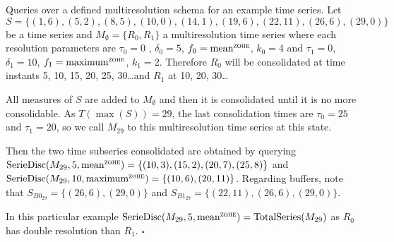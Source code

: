 \begin{example}\label{ex:model:smultiresolution} Queries over a defined
  multiresolution schema for an example time series.  Let $S = \{
  (1,6),(5,2),\allowbreak (8,5),\allowbreak (10,0),\allowbreak
  (14,1),\allowbreak (19,6),\allowbreak (22,11),\allowbreak
  (26,6),(29,0) \}$ be a time series and $M_\emptyset=\{R_0,R_1\}$ a
  multiresolution time series where each resolution parameters are
  $\tau_0=0$ , $\delta_0=5$, $f_0 =\meanz$, $k_0=4$ and $\tau_1=0$,
  $\delta_1=10$, $f_1 =\maxz$, $k_1=2$. Therefore $R_0$ will be
  consolidated at time instants 5, 10, 15, 20, 25, 30\dots and $R_1$
  at 10, 20, 30\dots

  All measures of $S$ are added to $M_\emptyset$
  and then it is consolidated until it is no more consolidable. As
  $T(\max(S))=29$, the last consolidation times are $\tau_0=25$ and
  $\tau_1=20$, so we call $M_{29}$ to this multiresolution time series
  at this state.

  Then the two time subseries consolidated are obtained by querying
  $\seriedisc(M_{29},5,\meanz)=\{(10,3),(15,2),\allowbreak
  (20,\allowbreak 7),\allowbreak (25,8)\}$ and
  $\seriedisc(M_{29},10,\maxz)= \{ \allowbreak (10,6),\allowbreak
  (20,11)\}$. Regarding buffers, note that $S_{B0_{29}}= \{\allowbreak
  (26,6),\allowbreak (29,0)\allowbreak \}$ and
  $S_{B1_{29}}=\{(22,11),(26,6),(29,0)\}$.

  In this particular example $\seriedisc(M_{29},5,\meanz)=\break
  \totalseries(M_{29})$ as $R_0$ has double resolution than
  $R_1$. $\square$
\end{example}







